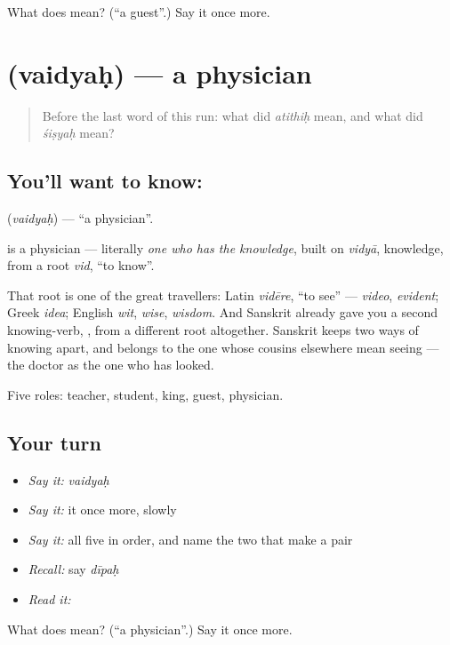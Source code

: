 \begin{tcolorbox}[breakable,colback=teal!4,colframe=teal!35!black,title={Before you move on}]
What does  mean? (\textquotedblleft{}a guest\textquotedblright{}.) Say it once more.
\end{tcolorbox}
\section[\texorpdfstring{\sk{वैद्यः} (vaidyaḥ)}{वैद्यः (vaidyaḥ)}]{ (vaidyaḥ) — a physician}

\label{lesson:SA-C26-physician}



\begin{quote}
Before the last word of this run: what did \emph{atithiḥ} mean, and what did \emph{śiṣyaḥ} mean?
\end{quote}

\subsection*{You'll want to know: }
\textbf{} (\emph{vaidyaḥ}) — \textquotedblleft{}a physician\textquotedblright{}.

\textbf{} is a physician — literally \emph{one who has the knowledge}, built on \emph{vidyā}, knowledge, from a root \emph{vid}, \textquotedblleft{}to know\textquotedblright{}.

That root is one of the great travellers: Latin \emph{vidēre}, \textquotedblleft{}to see\textquotedblright{} — \emph{video}, \emph{evident}; Greek \emph{idea}; English \emph{wit}, \emph{wise}, \emph{wisdom}. And Sanskrit already gave you a second knowing-verb, , from a different root altogether. Sanskrit keeps two ways of knowing apart, and  belongs to the one whose cousins elsewhere mean seeing — the doctor as the one who has looked.

\begin{grammarlens}[title={What you've built}]
Five roles: teacher, student, king, guest, physician.
\end{grammarlens}

\subsection*{Your turn}
\begin{itemize}
\raggedright
  \item \emph{Say it:} \emph{vaidyaḥ}
  \item \emph{Say it:} it once more, slowly
  \item \emph{Say it:} all five in order, and name the two that make a pair
  \item \emph{Recall:} say \emph{dīpaḥ}
  \item \emph{Read it:} \textbf{}
\end{itemize}

\begin{tcolorbox}[breakable,colback=teal!4,colframe=teal!35!black,title={Before you move on}]
What does  mean? (\textquotedblleft{}a physician\textquotedblright{}.) Say it once more.
\end{tcolorbox}

